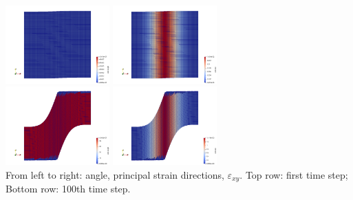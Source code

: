 \begin{center}
\includegraphics[width=4cm]{python_codes/fieldstone_89/results/shearband/old_angle_00}
\includegraphics[width=4cm]{python_codes/fieldstone_89/results/shearband/old_exy_00}\\
\includegraphics[width=4cm]{python_codes/fieldstone_89/results/shearband/old_angle_100}
\includegraphics[width=4cm]{python_codes/fieldstone_89/results/shearband/old_exy_100}\\
{\captionfont From left to right: angle, principal strain directions, $\varepsilon_{xy}$.
Top row: first time step; Bottom row: 100th time step.}
\end{center}


